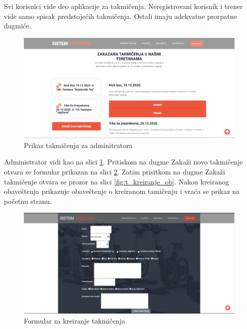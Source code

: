 \documentclass[../main.tex]{subfiles}
\begin{document}
Svi korisnici vide deo aplikacije za takmičenja. Neregistrovani korisnik i trener vide samo spisak predstojećih takmičenja. Ostali imaju adekvatne prorpatne dugmiće.

\begin{figure}[!ht]
\begin{center}
\includegraphics[scale=0.35]{sections/korisnicki_interfejs/screenshots/takmicenja_administrator.PNG}
\end{center}
\caption{Prikaz takmičenja za adminitratora}
\label{fig:t_admin}
\end{figure}

Administrator vidi kao na slici \ref{fig:t_admin}. Pritiskom na dugme Zakaži novo takmičenje otvara se formular prikazan na slici \ref{fig:t_kreiranje}. Zatim prisitkom na dugme Zakaži takmičenje otvara se prozor na slici \ref{fig:t_kreiranje_ob}. Nakon kreiranog obaveštenja prikazuje obaveštenje o kreiranom tamičenju i vraća se prikaz na početnu stranu. 

\begin{figure}[!ht]
\begin{center}
\includegraphics[scale=0.35]{sections/korisnicki_interfejs/screenshots/takmicenja_kreiranje.PNG}
\end{center}
\caption{Formular za kreiranje takmičenja}
\label{fig:t_kreiranje}
\end{figure}
\end{document}
